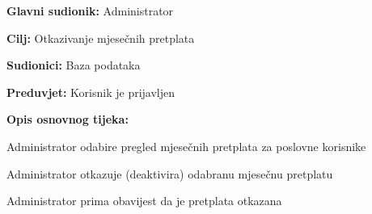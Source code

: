 				\noindent {}
				\begin{packed_item}
					
					\item \textbf{Glavni sudionik: } Administrator
					\item  \textbf{Cilj:} Otkazivanje mjesečnih pretplata
					\item  \textbf{Sudionici:} Baza podataka
					\item  \textbf{Preduvjet:} Korisnik je prijavljen
					\item  \textbf{Opis osnovnog tijeka:}
					
					\item[] \begin{packed_enum}
						
						\item Administrator odabire pregled mjesečnih pretplata za poslovne korisnike
						\item Administrator otkazuje (deaktivira) odabranu mjesečnu pretplatu
						\item Administrator prima obavijest da je pretplata otkazana
						
					\end{packed_enum}
					
				\end{packed_item}
			
					
